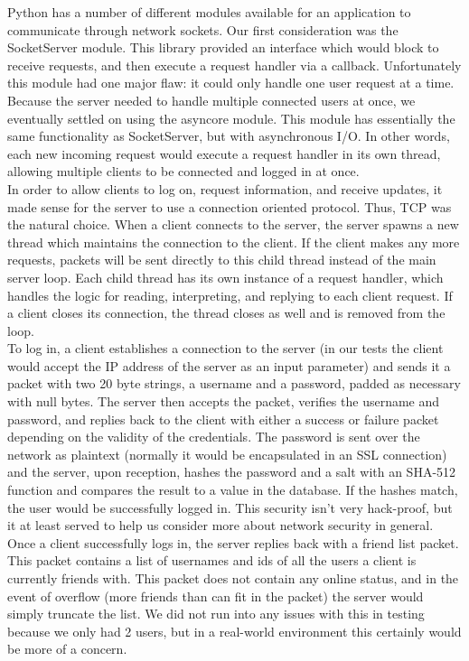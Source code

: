 \documentclass[9pt,twocolumn]{article}
\begin{document}
Python has a number of different modules available for an application to communicate
through network sockets. Our first consideration was the SocketServer module. This library
provided an interface which would block to receive requests, and then execute a request
handler via a callback. Unfortunately this module had one major flaw: it could only handle
one user request at a time. Because the server needed to handle multiple connected users
at once, we eventually settled on using the asyncore module. This module has essentially
the same functionality as SocketServer, but with asynchronous I/O. In other words, each
new incoming request would execute a request handler in its own thread, allowing multiple
clients to be connected and logged in at once.\\

In order to allow clients to log on, request information, and receive updates, it made
sense for the server to use a connection oriented protocol. Thus, TCP was the natural
choice. When a client connects to the server, the server spawns a new thread which maintains
the connection to the client. If the client makes any more requests, packets will be sent
directly to this child thread instead of the main server loop. Each child thread has its own
instance of a request handler, which handles the logic for reading, interpreting, and replying
to each client request. If a client closes its connection, the thread closes as well and is
removed from the loop. \\

To log in, a client establishes a connection to the server (in our tests
the client would accept the IP address of the server as an input parameter) and sends it
a packet with two 20 byte strings, a username and a password, padded as necessary with
null bytes. The server then accepts the packet, verifies the username and password, and
replies back to the client with either a success or failure packet depending on the
validity of the credentials. The password is sent over the network as plaintext (normally
it would be encapsulated in an SSL connection) and the server, upon reception, hashes
the password and a salt with an SHA-512 function and compares the result to a value in
the database. If the hashes match, the user would be successfully logged in. This
security isn't very hack-proof, but it at least served to help us consider more
about network security in general.\\

Once a client successfully logs in, the server replies back with a friend list packet.
This packet contains a list of usernames and ids of all the users a client is currently
friends with. This packet does not contain any online status, and in the event of
overflow (more friends than can fit in the packet) the server would simply truncate
the list. We did not run into any issues with this in testing because we only had 2
users, but in a real-world environment this certainly would be more of a concern.\\
\end{document}
